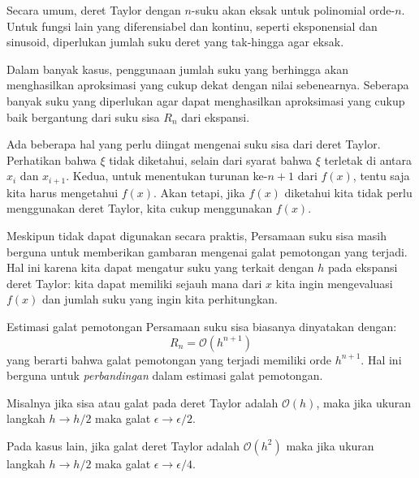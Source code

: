 \begin{frame}
Secara umum, deret Taylor dengan $n$-suku akan eksak untuk polinomial
orde-$n$. Untuk fungsi lain yang diferensiabel dan kontinu, seperti eksponensial
dan sinusoid, diperlukan jumlah suku deret yang tak-hingga agar eksak.

Dalam banyak kasus, penggunaan jumlah suku yang berhingga akan menghasilkan
aproksimasi yang cukup dekat dengan nilai sebenearnya. Seberapa banyak suku
yang diperlukan agar dapat menghasilkan aproksimasi yang cukup baik bergantung
dari suku sisa $R_{n}$ dari ekspansi.

Ada beberapa hal yang perlu diingat mengenai suku sisa dari deret Taylor.
Perhatikan bahwa $\xi$ tidak diketahui, selain dari syarat bahwa $\xi$ terletak
di antara $x_{i}$ dan $x_{i+1}$. Kedua, untuk menentukan turunan ke-$n+1$ dari
$f(x)$, tentu saja kita harus mengetahui $f(x)$. Akan tetapi, jika $f(x)$ diketahui
kita tidak perlu menggunakan deret Taylor, kita cukup menggunakan $f(x)$.

Meskipun tidak dapat digunakan secara praktis, Persamaan suku sisa masih
berguna untuk memberikan gambaran mengenai galat pemotongan yang terjadi.
Hal ini karena kita dapat mengatur suku yang terkait dengan $h$ pada ekspansi
deret Taylor: kita dapat memiliki sejauh mana dari $x$ kita ingin mengevaluasi $f(x)$
dan jumlah suku yang ingin kita perhitungkan.
\end{frame}



\begin{frame}{Estimasi galat pemotongan}
Persamaan suku sisa biasanya dinyatakan dengan:
$$
R_{n} = \mathcal{O}(h^{n+1})
$$
yang berarti bahwa galat pemotongan yang terjadi memiliki orde $h^{n+1}$. Hal ini
berguna untuk \textit{perbandingan} dalam estimasi galat pemotongan.

Misalnya jika sisa atau galat pada deret Taylor adalah $\mathcal{O}(h)$, maka
jika ukuran langkah $h \rightarrow h/2$ maka galat $\epsilon \rightarrow \epsilon/2$. 

Pada kasus lain, jika galat deret Taylor adalah $\mathcal{O}(h^2)$ maka
jika ukuran langkah $h \rightarrow h/2$ maka galat $\epsilon \rightarrow \epsilon/4$.

\end{frame}